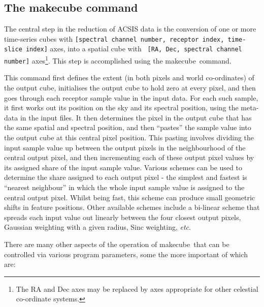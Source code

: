 \documentclass[twoside,11pt]{article}
\newcommand{\xref}[3]{#1}
\renewcommand{\_}{\texttt{\symbol{95}}}
\newcommand{\task}[1]{\textsf{#1}}
\newcommand{\makecube}{\xref{\task{makecube}}{sun258}{MAKECUBE}}
\begin{document}
\subsection{The makecube command}

The central step in the reduction of ACSIS data is the conversion of one
or more time-series cubes with {\tt [spectral channel number, receptor
index, time-slice index]} axes, into a spatial cube with {\tt
[RA, Dec, spectral channel number]} axes\footnote{The RA and Dec axes may
be replaced by axes appropriate for other celestial co-ordinate
systems.}. This step is accomplished using the \makecube\ command.

This command first defines the extent (in both pixels and world
co-ordinates) of the output cube, initialises the output cube to hold
zero at every pixel, and then goes through each receptor sample value in
the input data. For each such sample, it first works out its position on
the sky and its spectral position, using the meta-data in the input
files. It then determines the pixel in the output cube that has the same
spatial and spectral position, and then ``pastes'' the sample value into
the output cube at this central pixel position. This pasting involves
dividing the input sample value up between the output pixels in the
neighbourhood of the central output pixel, and then incrementing each of
these output pixel values by its assigned share of the input sample
value. Various schemes can be used to determine the share assigned to each
output pixel - the simplest and fastest is ``nearest neighbour'' in which
the whole input sample value is assigned to the central output pixel.
Whilst being fast, this scheme can produce small geometric shifts in
feature positions. Other available schemes include a bi-linear scheme
that spreads each input value out linearly between the four closest
output pixels, Gaussian weighting with a given radius, Sinc weighting,
{\em etc}.

There are many other aspects of the operation of \makecube\ that can be
controlled via various program parameters, some the more important of
which are:
\end{document}
